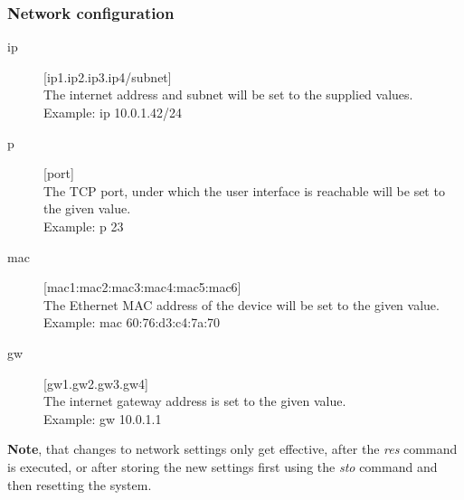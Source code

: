 \documentclass[a4paper]{scrreprt}
\begin{document}
\subsubsection{Network configuration}
\begin{description}
  \item[ip] [ip1.ip2.ip3.ip4/subnet]\\
    The internet address and subnet will be set to the supplied
    values.\\
    Example: ip 10.0.1.42/24
  \item[p] [port]\\
    The TCP port, under which the user interface is reachable will be
    set to the given value.\\
    Example: p 23
  \item[mac] [mac1:mac2:mac3:mac4:mac5:mac6]\\
    The Ethernet MAC address of the device will be set to the given value.\\
    Example: mac 60:76:d3:c4:7a:70
  \item[gw] [gw1.gw2.gw3.gw4]\\
    The internet gateway address is set to the given value.\\
    Example: gw 10.0.1.1
\end{description}
    \textbf{Note}, that changes to network settings only get effective, after the \emph{res} command is executed, or after storing the new settings first using the \emph{sto} command and then resetting the system.
\end{document}
